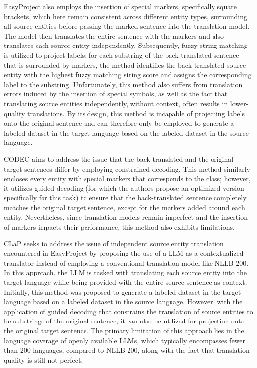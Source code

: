 EasyProject \cite{chen-etal-2023-frustratingly} also employs the insertion of special markers,
specifically square brackets, which here remain consistent across different entity types, surrounding all
source entities before passing the marked sentence into the translation
model. The model then translates the entire sentence with the markers and also translates each source
entity independently. Subsequently, fuzzy string matching is utilized to project labels: for each substring
of the back-translated sentence that is surrounded by markers, the method identifies the back-translated
source entity with the highest fuzzy matching string score and assigns the corresponding label to the substring.
Unfortunately, this method also suffers from translation errors induced by the insertion of special
symbols, as well as the fact that translating source entities independently, without context, often
results in lower-quality translations. By its design, this method is incapable of projecting labels
onto the original sentence and can therefore only be employed to generate a labeled dataset in the target language
based on the labeled dataset in the source language.

CODEC \cite{Le2024ConstrainedDF} aims to address the issue that the back-translated and the original
target sentences differ by employing constrained decoding. This method similarly encloses every entity
with special markers that corresponds to the class; however, it utilizes guided decoding
(for which the authors propose an optimized version specifically for this task) to ensure that
the back-translated sentence completely matches the original target sentence, except for the markers
added around each entity. Nevertheless, since translation models remain imperfect and the insertion
of markers impacts their performance, this method also exhibits limitations.

CLaP \cite{parekh-etal-2024-contextual} seeks to address the issue of independent source entity
translation encountered in EasyProject by proposing the use of a LLM as a contextualized translator
instead of employing a conventional translation model like NLLB-200. In this approach, the LLM is tasked
with translating each source entity into the target language while being provided with the entire
source sentence as context. Initially, this method was proposed to generate a labeled dataset in the
target language based on a labeled dataset in the source language. However, with the application of
guided decoding that constrains the translation of source entities to be substrings of the original
sentence, it can also be utilized for projection onto the original target sentence. The primary
limitation of this approach lies in the language coverage of openly available LLMs, which typically \cite{touvron2023llama2openfoundation}
encompasses fewer than 200 languages, compared to NLLB-200, along with the fact that translation
quality is still not perfect.

